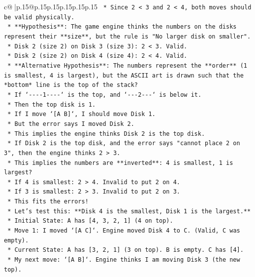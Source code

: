 \documentclass{article}
\begin{document}
{\begin{supertabular}{c@{$\;$}|p{.15\linewidth}@{}p{.15\linewidth}p{.15\linewidth}p{.15\linewidth}p{.15\linewidth}p{.15\linewidth}}
{{{\texttt{    *   Since 2 < 3 and 2 < 4, both moves should be valid physically.} \\
\texttt{    *   **Hypothesis**: The game engine thinks the numbers on the disks represent their **size**, but the rule is "No larger disk on smaller".} \\
\texttt{        *   Disk 2 (size 2) on Disk 3 (size 3): 2 < 3. Valid.} \\
\texttt{        *   Disk 2 (size 2) on Disk 4 (size 4): 2 < 4. Valid.} \\
\texttt{    *   **Alternative Hypothesis**: The numbers represent the **order** (1 is smallest, 4 is largest), but the ASCII art is drawn such that the *bottom* line is the top of the stack?} \\
\texttt{        *   If `{-}{-}{-}{-}1{-}{-}{-}{-}` is the top, and `{-}{-}{-}2{-}{-}{-}` is below it.} \\
\texttt{        *   Then the top disk is 1.} \\
\texttt{        *   If I move `{[}A B{]}`, I should move Disk 1.} \\
\texttt{        *   But the error says I moved Disk 2.} \\
\texttt{        *   This implies the engine thinks Disk 2 is the top disk.} \\
\texttt{        *   If Disk 2 is the top disk, and the error says "cannot place 2 on 3", then the engine thinks 2 > 3.} \\
\texttt{        *   This implies the numbers are **inverted**: 4 is smallest, 1 is largest?} \\
\texttt{            *   If 4 is smallest: 2 > 4. Invalid to put 2 on 4.} \\
\texttt{            *   If 3 is smallest: 2 > 3. Invalid to put 2 on 3.} \\
\texttt{            *   This fits the errors!} \\
\texttt{            *   Let's test this: **Disk 4 is the smallest, Disk 1 is the largest.**} \\
\texttt{            *   Initial State: A has {[}4, 3, 2, 1{]} (4 on top).} \\
\texttt{            *   Move 1: I moved `{[}A C{]}`. Engine moved Disk 4 to C. (Valid, C was empty).} \\
\texttt{            *   Current State: A has {[}3, 2, 1{]} (3 on top). B is empty. C has {[}4{]}.} \\
\texttt{            *   My next move: `{[}A B{]}`. Engine thinks I am moving Disk 3 (the new top).} \\
}}}
\end{supertabular}}
\end{document}
